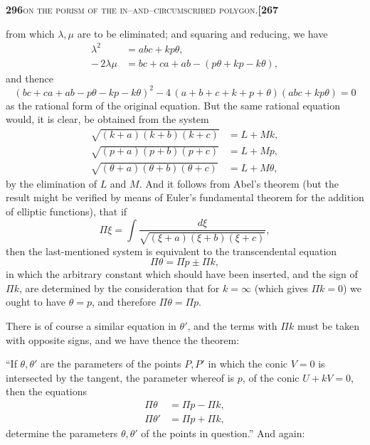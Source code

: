 \documentclass[11pt]{article}
\begin{document}
\newpage
\setcounter{page}{296}

\noindent\textbf{296}\hfill\textsc{on the porism of the in--and--circumscribed polygon.}\hfill\textbf{[267}

\medskip

\noindent from which $\lambda, \mu$ are to be eliminated; and squaring and reducing, we have
\[
\begin{aligned}
   \lambda^2 &= a b c + k p\theta,\\
   -\,2\lambda\mu &= b c + c a + a b - (p\theta + k p - k\theta),
\end{aligned}
\]
and thence
\[
   (b c + c a + a b - p\theta - k p - k\theta)^2 - 4\,(a + b + c + k + p + \theta)(a b c + k p\theta) = 0
\]
as the rational form of the original equation. But the same rational equation would, it is clear, be obtained from the system
\[
\begin{aligned}
   \sqrt{(k + a)(k + b)(k + c)} &= L + M k,\\
   \sqrt{(p + a)(p + b)(p + c)} &= L + M p,\\
   \sqrt{(\theta + a)(\theta + b)(\theta + c)} &= L + M \theta,
\end{aligned}
\]
by the elimination of $L$ and $M$. And it follows from Abel's theorem (but the result might be verified by means of Euler's fundamental theorem for the addition of elliptic functions), that if
\[
   \Pi\xi = \int\!\frac{d\xi}{\sqrt{(\xi + a)(\xi + b)(\xi + c)}},
\]
then the last-mentioned system is equivalent to the transcendental equation
\[
   \Pi\theta = \Pi p \pm \Pi k,
\]
in which the arbitrary constant which should have been inserted, and the sign of $\Pi k$, are determined by the consideration that for $k = \infty$ (which gives $\Pi k = 0$) we ought to have $\theta = p$, and therefore $\Pi\theta = \Pi p$.

\medskip

\noindent There is of course a similar equation in $\theta'$, and the terms with $\Pi k$ must be taken with opposite signs, and we have thence the theorem:

\medskip

\noindent ``If $\theta, \theta'$ are the parameters of the points $P, P'$ in which the conic $V = 0$ is intersected by the tangent, the parameter whereof is $p$, of the conic $U + kV = 0$, then the equations
\[
\begin{aligned}
   \Pi\theta  &= \Pi p - \Pi k,\\
   \Pi\theta' &= \Pi p + \Pi k,
\end{aligned}
\]
determine the parameters $\theta, \theta'$ of the points in question.'' And again:
\end{document}
